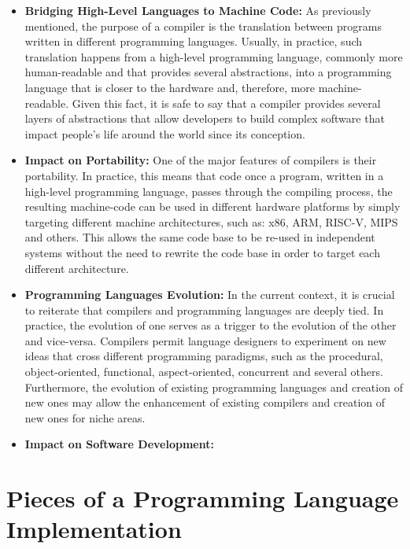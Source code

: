 \begin{itemize}
    \item \textbf{Bridging High-Level Languages to Machine Code:} As previously mentioned, the purpose of a compiler is the translation between programs written in different programming languages. Usually, in practice, such translation happens from a high-level programming language, commonly more human-readable and that provides several abstractions, into a programming language that is closer to the hardware and, therefore, more machine-readable. Given this fact, it is safe to say that a compiler provides several layers of abstractions that allow developers to build complex software that impact people's life around the world since its conception.
    
    \item \textbf{Impact on Portability:} One of the major features of compilers is their portability. In practice, this means that code once a program, written in a high-level programming language, passes through the compiling process, the resulting machine-code can be used in different hardware platforms by simply targeting different machine architectures, such as: x86, ARM, RISC-V, MIPS and others. This allows the same code base to be re-used in independent systems without the need to rewrite the code base in order to target each different architecture.
    
    \item \textbf{Programming Languages Evolution:} In the current context, it is crucial to reiterate that compilers and programming languages are deeply tied. In practice, the evolution of one serves as a trigger to the evolution of the other and vice-versa. Compilers permit language designers to experiment on new ideas that cross different programming paradigms, such as the procedural, object-oriented, functional, aspect-oriented, concurrent and several others. Furthermore, the evolution of existing programming languages and creation of new ones may allow the enhancement of existing compilers and creation of new ones for niche areas.
    
    \item \textbf{Impact on Software Development:}
    
\end{itemize}

\section{Pieces of a Programming Language Implementation}

